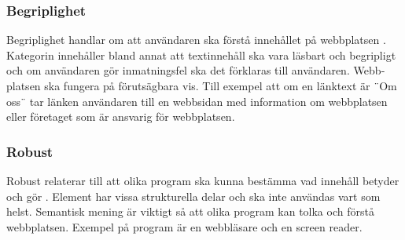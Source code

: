 \documentclass[11p]{article}
\begin{document}
\begin{otherlanguage}{swedish}
    \subsubsection{Begriplighet}
    Begriplighet handlar om att användaren ska förstå innehållet på webbplatsen \parencite{WCAG_2.2}.
    Kategorin innehåller bland annat att textinnehåll ska vara läsbart och begripligt och
    om användaren gör inmatningsfel ska det förklaras till användaren.
    Webbplatsen ska fungera på förutsägbara vis.
    Till exempel att om en länktext är ¨Om oss¨ tar länken användaren till en webbsidan med information om webbplatsen eller företaget som är ansvarig för webbplatsen.

    \subsubsection{Robust}
    Robust relaterar till att olika program ska kunna bestämma vad innehåll betyder och gör \parencite{WCAG_2.2}.
    Element har vissa strukturella delar och ska inte användas vart som helst.
    Semantisk mening är viktigt så att olika program kan tolka och förstå webbplatsen.
    Exempel på program är en webbläsare och en screen reader.


\end{otherlanguage}
\end{document}
